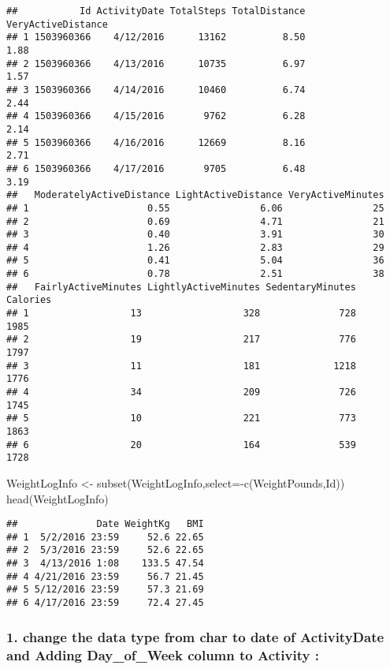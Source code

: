 \documentclass[
]{article}
\newenvironment{Shaded}{\begin{snugshade}}{\end{snugshade}}
\newcommand{\AttributeTok}[1]{\textcolor[rgb]{0.77,0.63,0.00}{#1}}
\newcommand{\FunctionTok}[1]{\textcolor[rgb]{0.00,0.00,0.00}{#1}}
\newcommand{\NormalTok}[1]{#1}
\newcommand{\OtherTok}[1]{\textcolor[rgb]{0.56,0.35,0.01}{#1}}
\newcommand{\SpecialCharTok}[1]{\textcolor[rgb]{0.00,0.00,0.00}{#1}}
\begin{document}
\begin{verbatim}
##           Id ActivityDate TotalSteps TotalDistance VeryActiveDistance
## 1 1503960366    4/12/2016      13162          8.50               1.88
## 2 1503960366    4/13/2016      10735          6.97               1.57
## 3 1503960366    4/14/2016      10460          6.74               2.44
## 4 1503960366    4/15/2016       9762          6.28               2.14
## 5 1503960366    4/16/2016      12669          8.16               2.71
## 6 1503960366    4/17/2016       9705          6.48               3.19
##   ModeratelyActiveDistance LightActiveDistance VeryActiveMinutes
## 1                     0.55                6.06                25
## 2                     0.69                4.71                21
## 3                     0.40                3.91                30
## 4                     1.26                2.83                29
## 5                     0.41                5.04                36
## 6                     0.78                2.51                38
##   FairlyActiveMinutes LightlyActiveMinutes SedentaryMinutes Calories
## 1                  13                  328              728     1985
## 2                  19                  217              776     1797
## 3                  11                  181             1218     1776
## 4                  34                  209              726     1745
## 5                  10                  221              773     1863
## 6                  20                  164              539     1728
\end{verbatim}

\begin{Shaded}
\begin{Highlighting}[]
\NormalTok{WeightLogInfo }\OtherTok{\textless{}{-}} \FunctionTok{subset}\NormalTok{(WeightLogInfo,}\AttributeTok{select=}\SpecialCharTok{{-}}\FunctionTok{c}\NormalTok{(WeightPounds,Id))}
\FunctionTok{head}\NormalTok{(WeightLogInfo)}
\end{Highlighting}
\end{Shaded}

\begin{verbatim}
##              Date WeightKg   BMI
## 1  5/2/2016 23:59     52.6 22.65
## 2  5/3/2016 23:59     52.6 22.65
## 3  4/13/2016 1:08    133.5 47.54
## 4 4/21/2016 23:59     56.7 21.45
## 5 5/12/2016 23:59     57.3 21.69
## 6 4/17/2016 23:59     72.4 27.45
\end{verbatim}

\hypertarget{change-the-data-type-from-char-to-date-of-activitydate-and-adding-day_of_week-column-to-activity}{%
\subsubsection{1. change the data type from char to date of ActivityDate
and Adding Day\_of\_Week column to Activity
:}\label{change-the-data-type-from-char-to-date-of-activitydate-and-adding-day_of_week-column-to-activity}}
\end{document}
